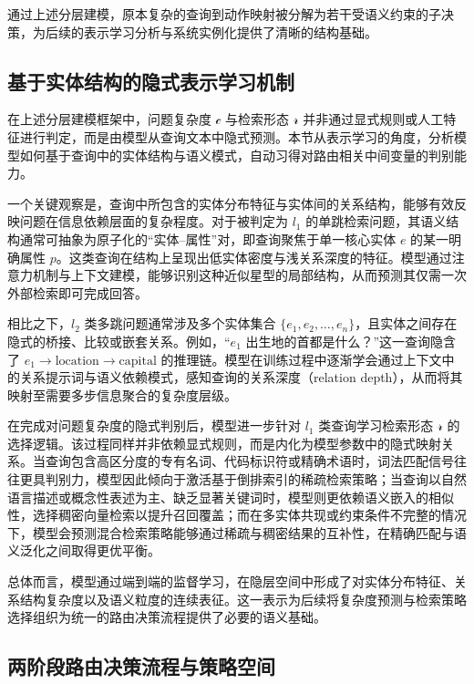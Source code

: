 通过上述分层建模，原本复杂的查询到动作映射被分解为若干受语义约束的子决策，为后续的表示学习分析与系统实例化提供了清晰的结构基础。

\subsection{基于实体结构的隐式表示学习机制}

在上述分层建模框架中，问题复杂度 $\mathcal{c}$ 与检索形态 $\mathcal{r}$ 并非通过显式规则或人工特征进行判定，而是由模型从查询文本中隐式预测。本节从表示学习的角度，分析模型如何基于查询中的实体结构与语义模式，自动习得对路由相关中间变量的判别能力。

一个关键观察是，查询中所包含的实体分布特征与实体间的关系结构，能够有效反映问题在信息依赖层面的复杂程度。对于被判定为 $l_1$ 的单跳检索问题，其语义结构通常可抽象为原子化的“实体–属性”对，即查询聚焦于单一核心实体 $e$ 的某一明确属性 $p$。这类查询在结构上呈现出低实体密度与浅关系深度的特征。模型通过注意力机制与上下文建模，能够识别这种近似星型的局部结构，从而预测其仅需一次外部检索即可完成回答。

相比之下，$l_2$ 类多跳问题通常涉及多个实体集合 $\{e_1, e_2, \dots, e_n\}$，且实体之间存在隐式的桥接、比较或嵌套关系。例如，“$e_1$ 出生地的首都是什么？”这一查询隐含了 $e_1 \rightarrow \text{location} \rightarrow \text{capital}$ 的推理链。模型在训练过程中逐渐学会通过上下文中的关系提示词与语义依赖模式，感知查询的关系深度（relation depth），从而将其映射至需要多步信息聚合的复杂度层级。

在完成对问题复杂度的隐式判别后，模型进一步针对 $l_1$ 类查询学习检索形态 $\mathcal{r}$ 的选择逻辑。该过程同样并非依赖显式规则，而是内化为模型参数中的隐式映射关系。当查询包含高区分度的专有名词、代码标识符或精确术语时，词法匹配信号往往更具判别力，模型因此倾向于激活基于倒排索引的稀疏检索策略；当查询以自然语言描述或概念性表述为主、缺乏显著关键词时，模型则更依赖语义嵌入的相似性，选择稠密向量检索以提升召回覆盖；而在多实体共现或约束条件不完整的情况下，模型会预测混合检索策略能够通过稀疏与稠密结果的互补性，在精确匹配与语义泛化之间取得更优平衡。

总体而言，模型通过端到端的监督学习，在隐层空间中形成了对实体分布特征、关系结构复杂度以及语义粒度的连续表征。这一表示为后续将复杂度预测与检索策略选择组织为统一的路由决策流程提供了必要的语义基础。

\subsection{两阶段路由决策流程与策略空间}

